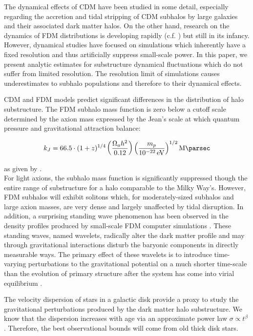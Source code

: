 \documentclass[usenatbib]{mnras}
\newcommand{\poweV}[1]{\SI{e#1}{\electronvolt}}
\begin{document}
\par
        The dynamical effects of CDM have been studied in some detail, especially regarding the accretion and tidal stripping of CDM subhalos by large galaxies and their associated dark matter halos. On the other hand, research on the dynamics of FDM distributions is developing rapidly (c.f. \cite{Schrodinger-Poisson, Schive-virialized-wave-halos}) but still in its infancy. However, dynamical studies have focused on simulations which inherently have a fixed resolution and thus artificially suppress small-scale power. In this paper, we present analytic estimates for substructure dynamical fluctuations which do not suffer from limited resolution. The resolution limit of simulations causes underestimates to subhalo populations and therefore to their dynamical effects. 
\par 
	CDM and FDM models predict significant differences in the distribution of halo substructure. The FDM subhalo mass function is zero below a cutoff scale determined by the axion mass expressed by the Jean’s scale at which quantum pressure and gravitational attraction balance:
\setlength{\belowdisplayskip}{4pt} \setlength{\belowdisplayshortskip}{4pt}
\setlength{\abovedisplayskip}{4pt} \setlength{\abovedisplayshortskip}{4pt}

\begin{equation}
k_J = 66.5 \cdot (1+z)^{1/4} \left( \frac{\Omega_a h^2}{0.12} \right) \left(\frac{m_p}{\poweV{-22}} \right)^{1/2} \si{\per\mega\parsec}
\end{equation}

as given by \citet{axion_cosmology}. \\ For light axions, the subhalo mass function is significantly suppressed though the entire range of substructure for a halo comparable to the Milky Way’s. However, FDM subhalos will exhibit solitons which, for moderately-sized subhalos and large axion masses, are very dense and largely unaffected by tidal disruption. In addition, a surprising standing wave phenomenon has been observed in the density profiles produced by small-scale FDM computer simulations \citep{cold_and_fuzzy}. These standing waves, named wavelets, radically alter the dark matter profile and may through gravitational interactions disturb the baryonic components in directly measurable ways. The primary effect of these wavelets is to introduce time-varying perturbations to the gravitational potential on a much shorter time-scale than the evolution of primary structure after the system has come into virial equilibrium \cite{Schrodinger-Poisson}. 
\par
	The velocity dispersion of stars in a galactic disk provide a proxy to study the gravitational perturbations produced by the dark matter halo substructure. We know that the dispersion increases with age via an approximate power law $\sigma \propto t^\beta$ \citep{heating_history}. Therefore, the best observational bounds will come from old thick disk stars.  
\end{document}
